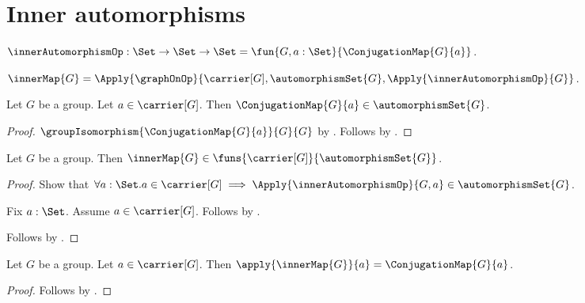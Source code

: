 

\section{Inner automorphisms}

\begin{definition}\label{inner_automorphism_op}
    $\innerAutomorphismOp:\Set\to\Set\to\Set
        =\fun{G,a:\Set}{\ConjugationMap{G}{a}}$.
\end{definition}

\begin{definition}\label{inner_map}
    $\innerMap{G}=
        \Apply{\graphOnOp}
            {\carrier[G],\automorphismSet{G},\Apply{\innerAutomorphismOp}{G}}$.
\end{definition}

\begin{proposition}\label{inner_automorphism_closed}
    Let $G$ be a group.
    Let $a\in\carrier[G]$.
    Then $\ConjugationMap{G}{a}\in\automorphismSet{G}$.
\end{proposition}
\begin{proof}
    $\groupIsomorphism{\ConjugationMap{G}{a}}{G}{G}$ by
        .
    Follows by .
\end{proof}

\begin{proposition}\label{inner_map_type}
    Let $G$ be a group.
    Then $\innerMap{G}\in\funs{\carrier[G]}{\automorphismSet{G}}$.
\end{proposition}
\begin{proof}
    Show that $\forall a:\Set.
        a\in\carrier[G]\implies
        \Apply{\innerAutomorphismOp}{G,a}
            \in\automorphismSet{G}$.
    \begin{subproof}
        Fix $a:\Set$.
        Assume $a\in\carrier[G]$.
        Follows by
            .
    \end{subproof}
    Follows by .
\end{proof}

\begin{proposition}\label{inner_map_apply}
    Let $G$ be a group.
    Let $a\in\carrier[G]$.
    Then $\apply{\innerMap{G}}{a}=\ConjugationMap{G}{a}$.
\end{proposition}
\begin{proof}
    Follows by
        .
\end{proof}

